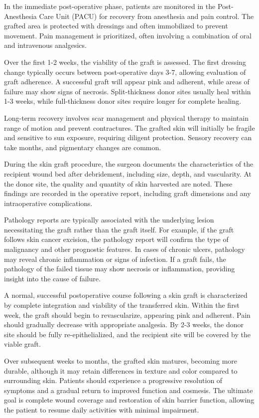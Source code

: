 In the immediate post-operative phase, patients are monitored in the Post-Anesthesia Care Unit (PACU) for recovery from anesthesia and pain control. The grafted area is protected with dressings and often immobilized to prevent movement. Pain management is prioritized, often involving a combination of oral and intravenous analgesics. 

Over the first 1-2 weeks, the viability of the graft is assessed. The first dressing change typically occurs between post-operative days 3-7, allowing evaluation of graft adherence. A successful graft will appear pink and adherent, while areas of failure may show signs of necrosis. Split-thickness donor sites usually heal within 1-3 weeks, while full-thickness donor sites require longer for complete healing. 

Long-term recovery involves scar management and physical therapy to maintain range of motion and prevent contractures. The grafted skin will initially be fragile and sensitive to sun exposure, requiring diligent protection. Sensory recovery can take months, and pigmentary changes are common.

During the skin graft procedure, the surgeon documents the characteristics of the recipient wound bed after debridement, including size, depth, and vascularity. At the donor site, the quality and quantity of skin harvested are noted. These findings are recorded in the operative report, including graft dimensions and any intraoperative complications.

Pathology reports are typically associated with the underlying lesion necessitating the graft rather than the graft itself. For example, if the graft follows skin cancer excision, the pathology report will confirm the type of malignancy and other prognostic features. In cases of chronic ulcers, pathology may reveal chronic inflammation or signs of infection. If a graft fails, the pathology of the failed tissue may show necrosis or inflammation, providing insight into the cause of failure.

A normal, successful postoperative course following a skin graft is characterized by complete integration and viability of the transferred skin. Within the first week, the graft should begin to revascularize, appearing pink and adherent. Pain should gradually decrease with appropriate analgesia. By 2-3 weeks, the donor site should be fully re-epithelialized, and the recipient site will be covered by the viable graft.

Over subsequent weeks to months, the grafted skin matures, becoming more durable, although it may retain differences in texture and color compared to surrounding skin. Patients should experience a progressive resolution of symptoms and a gradual return to improved function and cosmesis. The ultimate goal is complete wound coverage and restoration of skin barrier function, allowing the patient to resume daily activities with minimal impairment.

